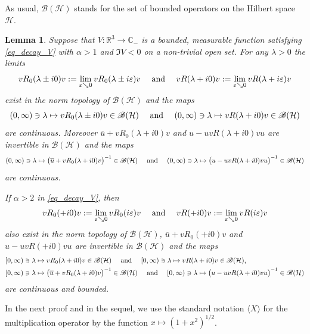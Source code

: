\documentclass{article}
\def\B{\mathscr B}
\def\C{\mathbb C}
\def\H{\mathcal H}
\def\R{\mathbb R}
\newtheorem{Lemma}[Theorem]{Lemma}
\begin{document}
As usual, $\B(\H)$ stands for the set of bounded operators on the Hilbert space $\H$.

\begin{Lemma}\label{lm:properties-R}
 Suppose that $V:\R^3\to \C_-$ is a bounded, measurable function satisfying \eqref{eq_decay_V} with $\alpha>1$ and $\Im V<0$ on a non-trivial open set. For any $\lambda >0$ the limits
$$
v R_0(\lambda \pm i0)v := \lim_{\varepsilon \searrow 0} v R_0(\lambda \pm i\varepsilon)v\quad\hbox{ and }\quad v R(\lambda + i0)v := \lim_{\varepsilon \searrow 0} v R(\lambda + i\varepsilon)v
$$
exist in the norm topology of $\B(\H)$ and the maps
$$
(0,\infty)\ni \lambda \mapsto v R_0(\lambda\pm i0)v \in \B(\H) \quad \hbox{ and } \quad (0,\infty)\ni \lambda \mapsto v R(\lambda+i0)v \in \B(\H)
$$
are continuous. Moreover $\overline{u} +v R_0(\lambda+i0)v$ and $u- uvR(\lambda+i0)vu$ are invertible in $\B(\H)$ and the maps
$$
(0,\infty)\ni \lambda \mapsto \big(\overline{u} +v R_0(\lambda+i0)v\big)^{-1} \in \B(\H) \quad\hbox{ and }\quad (0,\infty)\ni \lambda \mapsto \big(u- uvR(\lambda+i0)vu\big)^{-1} \in \B(\H)
$$
are continuous.

If $\alpha>2$ in \eqref{eq_decay_V}, then 
$$
v R_0(+i0)v := \lim_{\varepsilon \searrow 0} v R_0(i\varepsilon)v\quad\hbox{ and }\quad v R(+i0)v := \lim_{\varepsilon \searrow 0} v R(i\varepsilon)v
$$
also exist in the norm topology of $\B(\H)$, $\overline{u} +v R_0(+i0)v$ and $u- uvR(+i0)vu$ are invertible in $\B(\H)$ and the maps
\begin{align}
&[0,\infty)\ni \lambda \mapsto v R_0(\lambda+i0)v \in \B(\H) \quad \hbox{ and } \quad [0,\infty)\ni \lambda \mapsto v R(\lambda+i0)v \in \B(\H), \label{eq:bounded1} \\
&[0,\infty)\ni \lambda \mapsto \big(\overline{u} +v R_0(\lambda+i0)v\big)^{-1}\in \B(\H)\quad\hbox{ and }\quad [0,\infty)\ni \lambda \mapsto \big(u- uvR(\lambda+i0)vu\big)^{-1} \in \B(\H) \label{eq:bounded2}
\end{align}
are continuous and bounded.
\end{Lemma}

In the next proof and in the sequel, we use the standard notation $\langle X\rangle$ for the multiplication
operator by the function $x\mapsto (1+x^2)^{1/2}$.
\end{document}
